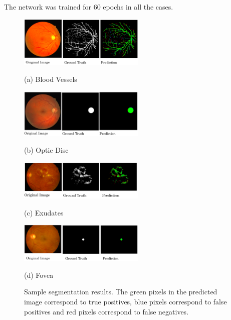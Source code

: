 \documentclass{article}
\begin{document}
The network was trained for 60 epochs in all the cases.

\begin{figure}[!ht]
  \begin{minipage}[b]{0.7\linewidth}
  \centering
  \centerline{\includegraphics[width=6cm]{images/bv_prediction.png}}
  \centerline{(a) Blood Vessels}\medskip
  \end{minipage}

  \begin{minipage}[b]{0.7\linewidth}
  \centering
  \centerline{\includegraphics[width=6cm]{images/od.png}}
  \centerline{(b) Optic Disc}\medskip
  \end{minipage}

  \begin{minipage}[b]{0.7\linewidth}
  \centering
  \centerline{\includegraphics[width=6cm]{images/ex.png}}
  \centerline{(c) Exudates}\medskip
  \end{minipage}

  \begin{minipage}[b]{0.7\linewidth}
  \centering
  \centerline{\includegraphics[width=6cm]{images/fovea.png}}
  \centerline{(d) Fovea}\medskip
  \end{minipage}

  \caption{Sample segmentation results. The green pixels in the predicted image correspond to true positives, blue pixels correspond to false positives and  red pixels correspond to false negatives.}
  \label{fig:segmentation_results}

\end{figure}
\end{document}
